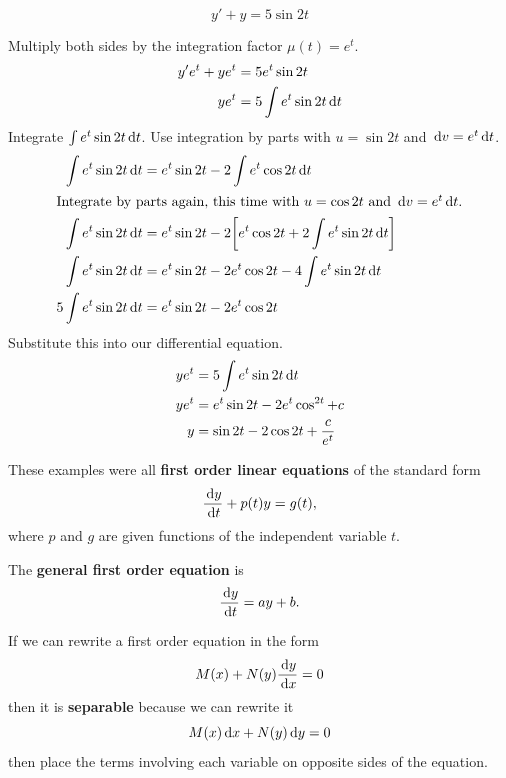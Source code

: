 \begin{ex}
  \[y' + y = 5 \sin {2t}\]
  \begin{sol}
   Multiply both sides by the integration factor $\mu (t) = e^t$.
   \begin{align*}
     y' e^t + ye^t &= 5 e^t \sin{2t} \\
     ye^t &= 5 \int e^t \sin{2t} \,\mathrm{d} t \\
   \end{align*}
   Integrate $\int e^t \sin{2t} \,\mathrm{d} t$. Use integration by parts with $u =\sin{2t}$ and $\,\mathrm{d} v = e^t \,\mathrm{d} t$.
   \begin{align*}
     \int e^t \sin{2t} \,\mathrm{d} t &= e^t \sin{2t}-2 \int e^t \cos{2t} \,\mathrm{d} t \\
     \intertext{Integrate by parts again, this time with $u = \cos{2t}$ and $\,\mathrm{d} v=e^t \,\mathrm{d} t$.}
     \int e^t \sin{2t} \,\mathrm{d} t &= e^t \sin{2t}-2 \bigg[ e^t \cos{2t} + 2 \int e^t \sin{2t} \,\mathrm{d} t \bigg] \\
     \int e^t \sin{2t} \,\mathrm{d} t &= e^t \sin{2t}-2 e^t \cos{2t} -4 \int e^t \sin{2t} \,\mathrm{d} t \\
     5\int e^t \sin{2t} \,\mathrm{d} t &= e^t \sin{2t}-2 e^t \cos{2t}
   \end{align*}
   Substitute this into our differential equation.
   \begin{align*}
     ye^t &= 5 \int e^t \sin{2t} \,\mathrm{d} t \\
     ye^t &= e^t \sin{2t} -2 e^t \cos^{2t} +c \\
     y &= \sin{2t}-2\cos{2t}+\frac{c}{e^t}
   \end{align*}
  \end{sol}
\end{ex}

These examples were all \textbf{first order linear equations} of the standard form
\begin{equation}
  \frac{\,\mathrm{d} y}{\,\mathrm{d} t}+p(t)y=g(t),
  \label{eq:1ordlineq}
\end{equation}
where $p$ and $g$ are given functions of the independent variable $t$.\cite[p. 32]{boycede}

The \textbf{general first order equation} is
\begin{equation}
  \frac{\,\mathrm{d} y}{\,\mathrm{d} t}=ay+b.
\end{equation}
\cite[p. 42]{boycede}

If we can rewrite a first order equation in the form
\begin{equation}
  M(x)+N(y)\frac{\,\mathrm{d} y}{\,\mathrm{d} x}=0
  \label{eq:separableode}
\end{equation}
then it is \textbf{separable} because we can rewrite it
\begin{equation}
  M(x)\,\mathrm{d} x+ N(y) \,\mathrm{d} y=0
\end{equation}
then place the terms involving each variable on opposite sides of the equation.

